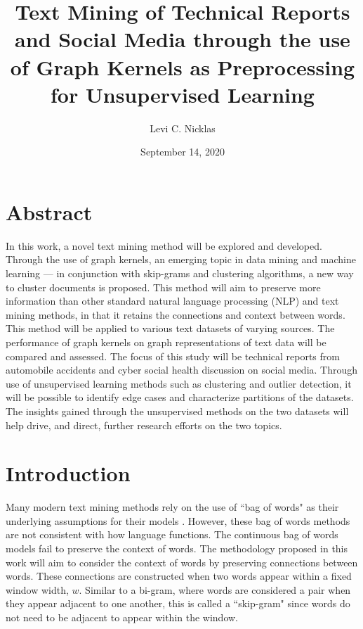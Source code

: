 \documentclass[11pt]{report}
\begin{document}
\title{Text Mining of Technical Reports and Social Media through the use of Graph Kernels as Preprocessing for Unsupervised Learning}
\author{Levi C. Nicklas}
\date{September 14, 2020}
\maketitle

\section{Abstract}

\hspace*{0.5cm} In this work, a novel text mining method will be explored and developed. Through the use of graph kernels, an emerging topic in data mining and machine learning --- in conjunction with skip-grams and clustering algorithms, a new way to cluster documents is proposed. This method will aim to preserve more information than other standard natural language processing (NLP) and text mining methods, in that it retains the connections and context between words. This method will be applied to various text datasets of varying sources. The performance of graph kernels on graph representations of text data will be compared and assessed. The focus of this study will be technical reports from automobile accidents and cyber social health discussion on social media. Through use of unsupervised learning methods such as clustering and outlier detection, it will be possible to identify edge cases and characterize partitions of the datasets. The insights gained through the unsupervised methods on the two datasets will help drive, and direct, further research efforts on the two topics.







\section{Introduction}

\hspace*{0.5cm} Many modern text mining methods rely on the use of ``bag of words" as their underlying assumptions for their models \cite{nikolentzos2017shortest}. However, these bag of words methods are not consistent with how language functions. The continuous bag of words models fail to preserve the context of words. The methodology proposed in this work will aim to consider the context of words by preserving connections between words. These connections are constructed when two words appear within a fixed window width, $w$. Similar to a bi-gram, where words are considered a pair when they appear adjacent to one another, this is called a ``skip-gram" since words do not need to be adjacent to appear within the window. 
\end{document}
